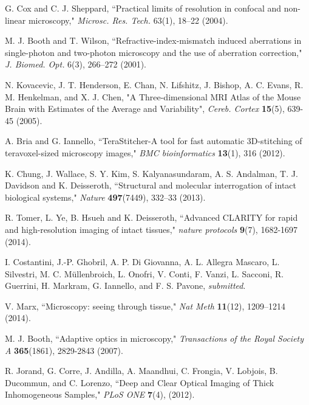\documentclass[12pt]{spieman}  %
\begin{document}
\begin{thebibliography}{0}
 G. Cox and C. J. Sheppard, ``Practical limits of resolution in confocal and non-linear microscopy," \emph{Microsc. Res. Tech.} 63(1), 18–22 (2004).

 M. J. Booth and T. Wilson, ``Refractive-index-mismatch induced aberrations in single-photon and two-photon microscopy and the use of aberration correction," \emph{J. Biomed. Opt.} 6(3), 266–272 (2001).


 N. Kovacevic, J. T. Henderson, E. Chan, N. Lifshitz, J. Bishop, A. C. Evans, R. M. Henkelman, and X. J. Chen, "A Three-dimensional MRI Atlas of the Mouse Brain with Estimates of the Average and Variability", \emph{Cereb. Cortex} \textbf{15}(5), 639-45 (2005).

 A. Bria and G. Iannello,  ``TeraStitcher-A tool for fast automatic 3D-stitching of teravoxel-sized microscopy images,"  \emph{BMC bioinformatics} \textbf{13}(1), 316 (2012).

 K. Chung, J. Wallace, S. Y. Kim, S. Kalyanasundaram, A. S. Andalman, T. J. Davidson and K. Deisseroth, ``Structural and molecular interrogation of intact biological systems," \emph{Nature} \textbf{497}(7449), 332–33 (2013).

 R. Tomer, L. Ye, B. Hsueh and K. Deisseroth, ``Advanced CLARITY for rapid and high-resolution imaging of intact tissues," \emph{nature protocols} \textbf{9}(7), 1682-1697 (2014).

 I. Costantini, J.-P. Ghobril, A. P. Di Giovanna, A. L. Allegra Mascaro, L. Silvestri, M. C. M\"{u}llenbroich, L. Onofri, V. Conti, F. Vanzi, L. Sacconi, R. Guerrini, H. Markram, G. Iannello, and F. S. Pavone, \emph{submitted}.

 V. Marx, ``Microscopy: seeing through tissue," \emph{Nat Meth} \textbf{11}(12), 1209–1214 (2014).

 M. J. Booth, ``Adaptive optics in microscopy," \emph{Transactions of the Royal Society A} \textbf{365}(1861), 2829-2843 (2007).

 R. Jorand, G. Corre, J. Andilla, A. Maandhui, C. Frongia, V. Lobjois, B. Ducommun, and C. Lorenzo, ``Deep and Clear Optical Imaging of Thick Inhomogeneous Samples," \emph{PLoS ONE} \textbf{7}(4), (2012).


\end{thebibliography}
\end{document}
